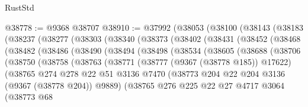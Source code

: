 \begin{lexlean}{RustStd}
\begin{coremodule}
@38778 := @9368 @38707
@38910 := @37992
    (@38053
      (@38100
        (@38143
          (@38183
            (@38237
              (@38277
                (@38303
                  (@38340
                    (@38373
                      (@38402
                        (@38431
                          (@38452
                            (@38468
                              (@38482
                                (@38486
                                  (@38490
                                    (@38494
                                      (@38498
                                        (@38534
                                          (@38605
                                            (@38688
                                              (@38706
                                                (@38750
                                                  (@38758
                                                    (@38763
                                                      (@38771
                                                        (@38777 (@9367 (@38778 @185)) @17622)
                                                        (@38765
                                                          @274
                                                          @278
                                                          @22
                                                          @51
                                                          @3136
                                                          @7470
                                                          (@38773
                                                            @204
                                                            @22
                                                            @204
                                                            @3136
                                                            (@9367 (@38778 @204))
                                                            @9889)
                                                          (@38765
                                                            @276
                                                            @225
                                                            @22
                                                            @27
                                                            @4717
                                                            @3064
                                                            (@38773
                                                              @68

\end{coremodule}
\end{lexlean}
